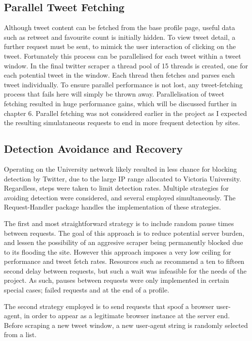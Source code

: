 \subsection{Parallel Tweet Fetching}

Although tweet content can be fetched from the base profile page, useful data such as retweet and favourite count is initially hidden. To view tweet detail, a further request must be sent, to mimick the user interaction of clicking on the tweet. Fortunately this process can be parallelised for each tweet within a tweet window. In the final twitter scraper a thread pool of 15 threads is created, one for each potential tweet in the window. Each thread then fetches and parses each tweet individually. To ensure parallel performance is not lost, any tweet-fetching process that fails here will simply be thrown away. Parallelisation of tweet fetching resulted in huge performance gains, which will be discussed further in chapter 6. Parallel fetching was not considered earlier in the project as I expected the resulting simulataneous requests to end in more frequent detection by sites. 

\subsection{Detection Avoidance and Recovery}

Operating on the University network likely resulted in less chance for blocking detection by Twitter, due to the large IP range allocated to Victoria University. Regardless, steps were taken to limit detection rates. Multiple strategies for avoiding detection were considered, and several employed simultaneously. The Request-Handler package handles the implementation of these strategies.

The first and most straightforward strategy is to include random pause times between requests. The goal of this approach is to reduce potential server burden, and lessen the possibility of an aggresive scraper being permanently blocked due to its flooding the site. However this approach imposes a very low ceiling for performance and tweet fetch rates. Resources such as \cite{} recommend a ten to fifteen second delay between requests, but such a wait was infeasible for the needs of the project. As such, pauses between requests were only implemented in certain special cases; failed requests and at the end of a profile. 

The second strategy employed is to send requests that spoof a browser user-agent, in order to appear as a legitimate browser instance at the server end. Before scraping a new tweet window, a new user-agent string is randomly selected from a list. 

